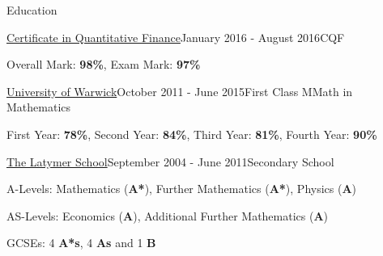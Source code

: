 \documentclass{resume} %
\begin{document}
\begin{rSection}{Education}
	\begin{rSubsection}{\href{https://www.cqf.com/}{Certificate in Quantitative Finance}}{January 2016 - August 2016}{CQF}{}
		\item Overall Mark: {\bf 98\%}, Exam Mark: {\bf 97\%}
		\iffalse
		\item Part time financial engineering program that covers a range of topics such as stochastic analysis, portfolio optimization, option pricing, Monte-Carlo methods, finite differences method
		\item Learning about modelling within different asset classes such as equities, currencies, fixed income, commodities and credit
		\fi
	\end{rSubsection}
	\begin{rSubsection}{\href{https://warwick.ac.uk/fac/sci/maths/}{University of Warwick}}{October 2011 - June 2015}{First Class MMath in Mathematics}{}
		\item First Year: {\bf 78\%},  %
		Second Year: {\bf 84\%},  %
		Third Year: {\bf 81\%}, %
		Fourth Year: {\bf 90\%} %
		\iffalse		
		\item  Relevant modules: Stochastic Analysis, Brownian Motion, Uncertainty Quantification, Data Assimilation, Matrix Analysis \& Algorithms and High Performance Computing
		\item Fourth year project entitled Asynchronous Parallel Numerical Optimization. Utilised parallel computing in Matlab. Designed and implemented an algorithm for function optimization based on genetic algorithms
		\item Warwick Mathematics Society - contributed by composing revision guides for over 800 students, running LaTeX workshops and revision lectures for over 300 students. Warwick Poker Society - developed a new website and taught members about analytical strategies
		\fi
	\end{rSubsection}
	\begin{rSubsection}{\href{https://www.latymer.co.uk}{The Latymer School}}{September 2004 - June 2011}{Secondary School}{}
		\item A-Levels: Mathematics ({\bf A*}), Further Mathematics ({\bf A*}), Physics ({\bf A}) 
		\item AS-Levels: Economics ({\bf A}), Additional Further Mathematics ({\bf A}) 
		\item GCSEs: 4 {\bf A*s}, 4 {\bf As} and 1 {\bf B}
	\end{rSubsection}
\end{rSection}
\end{document}

